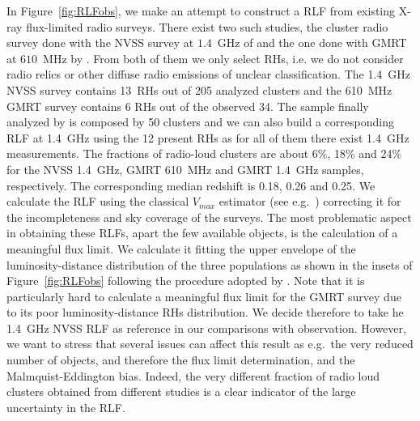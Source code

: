 \documentclass[traditabstract]{aa}
\begin{document}
\begin{appendix}
In Figure~\ref{fig:RLFobs}, we make an attempt to construct a RLF from existing X-ray flux-limited radio surveys. There exist two such studies, the cluster radio survey done with the NVSS survey at $1.4$~GHz of \cite{1999NewA....4..141G} and the one done with GMRT at $610$~MHz by \cite{VenturiGMRT_1,VenturiGMRT_2}. From both of them we only select RHs, i.e. we do not consider radio relics or other diffuse radio emissions of unclear classification. The 1.4~GHz NVSS survey contains 13~RHs out of 205 analyzed clusters and the 610~MHz GMRT survey contains 6 RHs out of the observed 34. The sample finally analyzed by \cite{VenturiGMRT_1,VenturiGMRT_2} is composed by 50 clusters and we can also build a corresponding RLF at 1.4~GHz using the 12 present RHs as for all of them there exist 1.4~GHz measurements. The fractions of radio-loud clusters are about 6\%, 18\% and 24\% for the NVSS 1.4~GHz, GMRT 610~MHz and GMRT 1.4~GHz samples, respectively. The corresponding median redshift is 0.18, 0.26 and 0.25. We calculate the RLF using the classical $V_{max}$ estimator (see e.g.~\citealp{1976ApJ...207..700F}) correcting it for the incompleteness and sky coverage of the surveys. The most problematic aspect in obtaining these RLFs, apart the few available objects, is the calculation of a meaningful flux limit. We calculate it fitting the upper envelope of the luminosity-distance distribution of the three populations as shown in the insets of Figure~\ref{fig:RLFobs} following the procedure adopted by \cite{2011arXiv1106.5494B}. Note that it is particularly hard to calculate a meaningful flux limit for the GMRT survey due to its poor luminosity-distance RHs distribution. We decide therefore to take he 1.4~GHz NVSS RLF as reference in our comparisons with observation. However, we want to stress that several issues can affect this result as e.g.~the very reduced number of objects, and therefore the flux limit determination, and the Malmquist-Eddington bias. Indeed, the very different fraction of radio loud clusters obtained from different studies is a clear indicator of the large uncertainty in the RLF.


\end{appendix}
\end{document}
